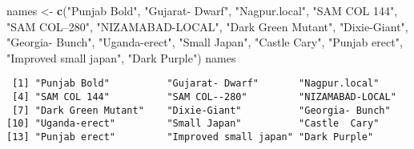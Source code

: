 \documentclass[]{article}
\newenvironment{Shaded}{\begin{snugshade}}{\end{snugshade}}
\newcommand{\KeywordTok}[1]{\textcolor[rgb]{0.13,0.29,0.53}{\textbf{#1}}}
\newcommand{\NormalTok}[1]{#1}
\newcommand{\StringTok}[1]{\textcolor[rgb]{0.31,0.60,0.02}{#1}}
\begin{document}
\begin{Shaded}
\begin{Highlighting}[]
\NormalTok{names <-}\StringTok{ }\KeywordTok{c}\NormalTok{(}\StringTok{"Punjab Bold"}\NormalTok{, }\StringTok{"Gujarat- Dwarf"}\NormalTok{, }\StringTok{"Nagpur.local"}\NormalTok{, }\StringTok{"SAM COL 144"}\NormalTok{,}
           \StringTok{"SAM COL--280"}\NormalTok{, }\StringTok{"NIZAMABAD-LOCAL"}\NormalTok{, }\StringTok{"Dark Green Mutant"}\NormalTok{,}
           \StringTok{"Dixie-Giant"}\NormalTok{, }\StringTok{"Georgia- Bunch"}\NormalTok{, }\StringTok{"Uganda-erect"}\NormalTok{, }\StringTok{"Small Japan"}\NormalTok{,}
           \StringTok{"Castle  Cary"}\NormalTok{, }\StringTok{"Punjab erect"}\NormalTok{, }\StringTok{"Improved small japan"}\NormalTok{,}
           \StringTok{"Dark Purple"}\NormalTok{)}
\NormalTok{names}
\end{Highlighting}
\end{Shaded}

\begin{verbatim}
 [1] "Punjab Bold"          "Gujarat- Dwarf"       "Nagpur.local"        
 [4] "SAM COL 144"          "SAM COL--280"         "NIZAMABAD-LOCAL"     
 [7] "Dark Green Mutant"    "Dixie-Giant"          "Georgia- Bunch"      
[10] "Uganda-erect"         "Small Japan"          "Castle  Cary"        
[13] "Punjab erect"         "Improved small japan" "Dark Purple"         
\end{verbatim}
\end{document}
